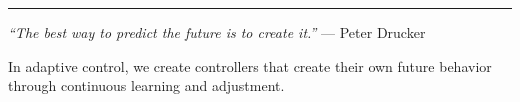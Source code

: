 \vfill

\begin{center}
\rule{0.5\textwidth}{0.4pt}

\textit{``The best way to predict the future is to create it.''} --- Peter Drucker

\vspace{1em}

In adaptive control, we create controllers that create their own future behavior through continuous learning and adjustment.
\end{center}

